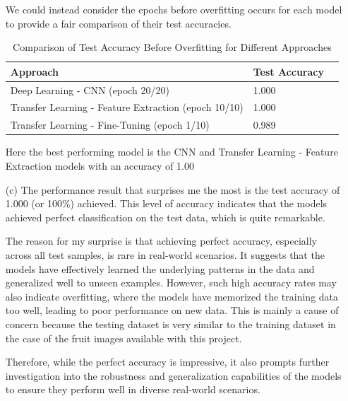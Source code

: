\documentclass[a4paper,10 pt]{article}
\begin{document}
\begin{itemize}[]
    \item[] We could instead consider the epochs before overfitting occurs for each model to provide a fair comparison of their test accuracies.
    \begin{table}[H]
      \centering
      \caption{Comparison of Test Accuracy Before Overfitting for Different Approaches}
      \label{tab:results}
      \begin{tabular}{@{}lll@{}}
      \toprule
      \textbf{Approach} & \textbf{Test Accuracy}  \\ \midrule
      Deep Learning - CNN (epoch 20/20) & 1.000  \\
      Transfer Learning - Feature Extraction (epoch 10/10) & 1.000  \\
      Transfer Learning - Fine-Tuning (epoch 1/10) & 0.989  \\ \bottomrule
      \end{tabular}
      \end{table}
      \item[] Here the best performing model is the CNN and Transfer Learning - Feature Extraction models with an accuracy of 1.00

  \item[(c)] The performance result that surprises me the most is the test accuracy of 1.000 (or 100\%) achieved. This level of accuracy indicates that the models achieved perfect classification on the test data, which is quite remarkable.
  \item [] The reason for my surprise is that achieving perfect accuracy, especially across all test samples, is rare in real-world scenarios. It suggests that the models have effectively learned the underlying patterns in the data and generalized well to unseen examples. However, such high accuracy rates may also indicate overfitting, where the models have memorized the training data too well, leading to poor performance on new data. This is mainly a cause of concern because the testing dataset is very similar to the training dataset in the case of the fruit images available with this project.
  
  \item[] Therefore, while the perfect accuracy is impressive, it also prompts further investigation into the robustness and generalization capabilities of the models to ensure they perform well in diverse real-world scenarios.  




\end{itemize}

\end{document}
